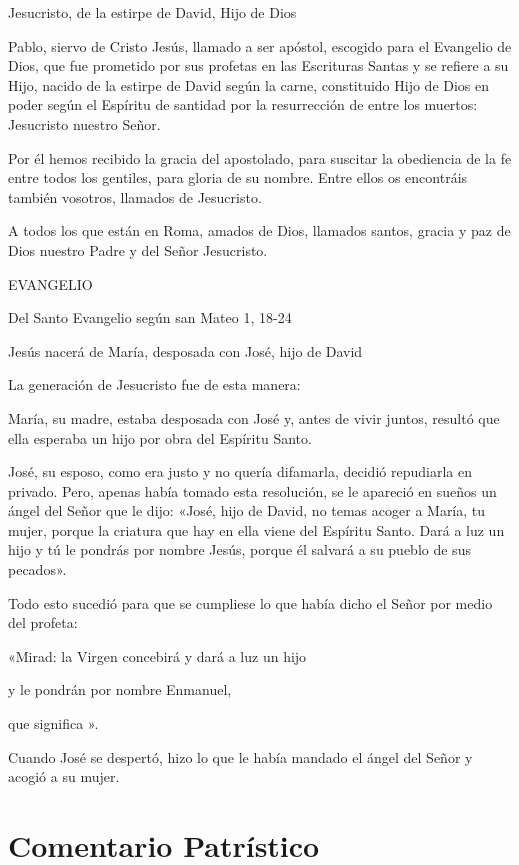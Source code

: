 \begin{body}
\begin{body}
Jesucristo, de la estirpe de David, Hijo de Dios

Pablo, siervo de Cristo Jesús, llamado a ser apóstol, escogido para el
Evangelio de Dios, que fue prometido por sus profetas en las Escrituras
Santas y se refiere a su Hijo, nacido de la estirpe de David según la
carne, constituido Hijo de Dios en poder según el Espíritu de santidad
por la resurrección de entre los muertos: Jesucristo nuestro Señor.

Por él hemos recibido la gracia del apostolado, para suscitar la
obediencia de la fe entre todos los gentiles, para gloria de su nombre.
Entre ellos os encontráis también vosotros, llamados de Jesucristo.

A todos los que están en Roma, amados de Dios, llamados santos, gracia y
paz de Dios nuestro Padre y del Señor Jesucristo.

EVANGELIO

Del Santo Evangelio según san Mateo 1, 18-24

Jesús nacerá de María, desposada con José, hijo de David

La generación de Jesucristo fue de esta manera:

María, su madre, estaba desposada con José y, antes de vivir juntos,
resultó que ella esperaba un hijo por obra del Espíritu Santo.

José, su esposo, como era justo y no quería difamarla, decidió
repudiarla en privado. Pero, apenas había tomado esta resolución, se le
apareció en sueños un ángel del Señor que le dijo: «José, hijo de David,
no temas acoger a María, tu mujer, porque la criatura que hay en ella
viene del Espíritu Santo. Dará a luz un hijo y tú le pondrás por nombre
Jesús, porque él salvará a su pueblo de sus pecados».

Todo esto sucedió para que se cumpliese lo que había dicho el Señor por
medio del profeta:

«Mirad: la Virgen concebirá y dará a luz un hijo

y le pondrán por nombre Enmanuel,

que significa ».

Cuando José se despertó, hizo lo que le había mandado el ángel del Señor
y acogió a su mujer.



\section{Comentario Patrístico}


\end{body}
\end{body}
